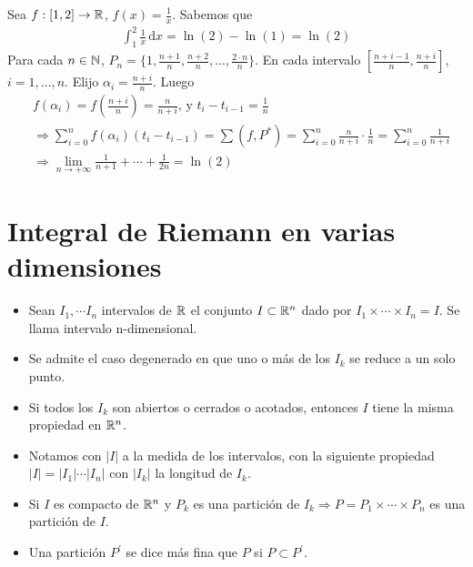 \begin{eg}
  Sea \(f: [1, 2] \to \mathbb{R} \), \(f(x) = \frac{1}{x} \). Sabemos que \begin{align*}\int_1^2 \frac{1}{x} \, \mathrm{d}x = \ln(2) - \ln(1) = \ln(2)\end{align*} Para cada \(n \in \mathbb{N} \), \(P_n = \{1, \frac{n+1}{n}, \frac{n+2}{n}, \ldots, \frac{2 \cdot n}{n}\} \). En cada intervalo \([\frac{n+i-1}{n}, \frac{n+i}{n}]\), \(i = 1, \ldots, n\). Elijo \(\alpha_i = \frac{n+i}{n} \). Luego
  \begin{align*}
     & f(\alpha_i) = f(\frac{n+i}{n}) = \frac{n}{n+i} \text{, y } t_i - t_{i-1} = \frac{1}{n}                                                                \\
     & \Rightarrow \sum_{i = 0}^n f(\alpha_i) (t_i - t_{i-1}) = \sum(f, P^*) = \sum_{i = 0}^n \frac{n}{n+i} \cdot \frac{1}{n} = \sum_{i = 0}^n \frac{1}{n+i} \\
     & \Rightarrow \lim_{n \to +\infty} \frac{1}{n+1} + \cdots + \frac{1}{2n} = \ln(2)
  \end{align*}
\end{eg}

\section{Integral de Riemann en varias dimensiones}

\begin{itemize}
  \item Sean \(I_1, \cdots I_n\) intervalos de \(\mathbb{R} \) el conjunto \(I \subset \mathbb{R}^n\) dado por \(I_1 \times \cdots \times I_n = I\). Se llama intervalo n-dimensional.
  \item Se admite el caso degenerado en que uno o más de los \(I_k\) se reduce a un solo punto.
  \item Si todos los \(I_k\) son abiertos o cerrados o acotados, entonces \(I\) tiene la misma propiedad en \(\mathbb{R}^n\).
  \item Notamos con \(|I|\) a la medida de los intervalos, con la siguiente propiedad \(|I| = |I_1| \cdots |I_n|\) con \(|I_k|\) la longitud de \(I_k\).
  \item Si \(I\) es compacto de \(\mathbb{R}^n\) y \(P_k\) es una partición de \(I_k \Rightarrow P = P_1 \times \cdots \times P_n\) es una partición de \(I\).
  \item Una partición \(P^{\prime} \) se dice más fina que \(P\) si \(P \subset P^{\prime} \).
\end{itemize}

